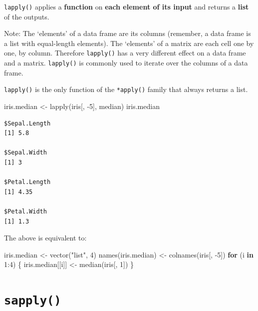 \documentclass[
]{book}
\makeatletter
\newenvironment{Shaded}{\begin{snugshade}}{\end{snugshade}}
\newcommand{\ControlFlowTok}[1]{\textcolor[rgb]{0.13,0.29,0.53}{\textbf{#1}}}
\newcommand{\DecValTok}[1]{\textcolor[rgb]{0.00,0.00,0.81}{#1}}
\newcommand{\FunctionTok}[1]{\textcolor[rgb]{0.00,0.00,0.00}{#1}}
\newcommand{\NormalTok}[1]{#1}
\newcommand{\OtherTok}[1]{\textcolor[rgb]{0.56,0.35,0.01}{#1}}
\newcommand{\SpecialCharTok}[1]{\textcolor[rgb]{0.00,0.00,0.00}{#1}}
\newcommand{\StringTok}[1]{\textcolor[rgb]{0.31,0.60,0.02}{#1}}
\newenvironment{kframe}{%
\medskip{}
\setlength{\fboxsep}{.8em}
 \def\at@end@of@kframe{}%
 \ifinner\ifhmode%
  \def\at@end@of@kframe{\end{minipage}}%
  \begin{minipage}{\columnwidth}%
 \fi\fi%
 \def\FrameCommand##1{\hskip\@totalleftmargin \hskip-\fboxsep
 \colorbox{shadecolor}{##1}\hskip-\fboxsep
     \hskip-\linewidth \hskip-\@totalleftmargin \hskip\columnwidth}%
 \MakeFramed {\advance\hsize-\width
   \@totalleftmargin\z@ \linewidth\hsize
   \@setminipage}}%
 {\par\unskip\endMakeFramed%
 \at@end@of@kframe}
\newenvironment{rmdblock}[1]
  {
  \begin{itemize}
  \renewcommand{\labelitemi}{
    \raisebox{-.7\height}[0pt][0pt]{
      {\setkeys{Gin}{width=3em,keepaspectratio}\texttt{[image: images/\#1]}}
    }
  }
  \setlength{\fboxsep}{1em}
  \begin{kframe}
  \item
  }
  {
  \end{kframe}
  \end{itemize}
  }
\newenvironment{info}
  {\begin{rmdblock}{info}}
  {\end{rmdblock}}
\makeatother
\begin{document}
\begin{info}
\texttt{lapply()} applies a \textbf{function} on \textbf{each element of
its input} and returns a \textbf{list} of the outputs.
\end{info}

Note: The `elements' of a data frame are its columns (remember, a data frame is a list with equal-length elements). The `elements' of a matrix are each cell one by one, by column. Therefore \texttt{lapply()} has a very different effect on a data frame and a matrix. \texttt{lapply()} is commonly used to iterate over the columns of a data frame.

\texttt{lapply()} is the only function of the \texttt{*apply()} family that always returns a list.

\begin{Shaded}
\begin{Highlighting}[]
\NormalTok{iris.median }\OtherTok{\textless{}{-}} \FunctionTok{lapply}\NormalTok{(iris[, }\SpecialCharTok{{-}}\DecValTok{5}\NormalTok{], median)}
\NormalTok{iris.median}
\end{Highlighting}
\end{Shaded}

\begin{verbatim}
$Sepal.Length
[1] 5.8

$Sepal.Width
[1] 3

$Petal.Length
[1] 4.35

$Petal.Width
[1] 1.3
\end{verbatim}

The above is equivalent to:

\begin{Shaded}
\begin{Highlighting}[]
\NormalTok{iris.median }\OtherTok{\textless{}{-}} \FunctionTok{vector}\NormalTok{(}\StringTok{"list"}\NormalTok{, }\DecValTok{4}\NormalTok{)}
\FunctionTok{names}\NormalTok{(iris.median) }\OtherTok{\textless{}{-}} \FunctionTok{colnames}\NormalTok{(iris[, }\SpecialCharTok{{-}}\DecValTok{5}\NormalTok{])}
\ControlFlowTok{for}\NormalTok{ (i }\ControlFlowTok{in} \DecValTok{1}\SpecialCharTok{:}\DecValTok{4}\NormalTok{) \{}
\NormalTok{  iris.median[[i]] }\OtherTok{\textless{}{-}} \FunctionTok{median}\NormalTok{(iris[, }\DecValTok{1}\NormalTok{])}
\NormalTok{\}}
\end{Highlighting}
\end{Shaded}

\hypertarget{sapply}{%
\section{\texorpdfstring{\texttt{sapply()}}{sapply()}}\label{sapply}}
\end{document}
